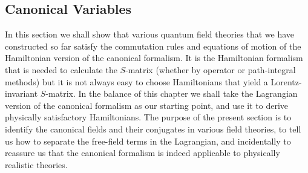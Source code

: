 \subsection{Canonical Variables}

In this section we shall show that various quantum field theories that we
have constructed so far satisfy the commutation rules and equations of
motion of the Hamiltonian version of the canonical formalism. It is the
Hamiltonian formalism that is needed to calculate the $S$-matrix (whether
by operator or path-integral methods) but it is not always easy to choose
Hamiltonians that yield a Lorentz-invariant $S$-matrix. In the balance
of this chapter we shall take the Lagrangian version of the canonical
formalism as our starting point, and use it to derive physically satisfactory
Hamiltonians. The purpose of the present section is to identify the
canonical fields and their conjugates in various field theories, to tell us
how to separate the free-field terms in the Lagrangian, and incidentally to
reassure us that the canonical formalism is indeed applicable to physically
realistic theories.

